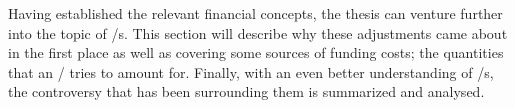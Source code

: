 \documentclass[main.tex]{subfiles}
\begin{document}
    Having established the relevant financial concepts, 
    the thesis can venture further into the topic of \FVA/s.
    This section will describe why these adjustments came about in the first place
    as well as covering some sources of funding costs; 
    the quantities that an \FVA/ tries to amount for.
    Finally, with an even better understanding of \FVA/s, 
    the controversy that has been surrounding them is summarized and analysed. 
    
\end{document}
